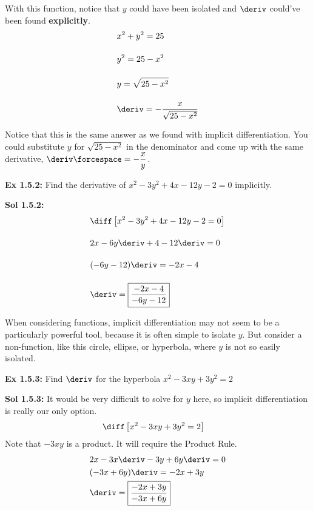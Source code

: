 With this function, notice that $y$ could have been isolated and $\deriv$ could've been found \textbf{explicitly}. \begin{align*}
    & x^2 + y^2 = 25 \\[11pt]
    & y^2 = 25 - x^2 \\[11pt]
    & y = \sqrt{25 - x^2} \\[11pt]
    & \deriv = -\dfrac{x}{\sqrt{25 - x^2}}
\end{align*}

Notice that this is the same answer as we found with implicit differentiation. You could substitute $y$ for $\sqrt{25 - x^2}$ in the denominator and come up with the same derivative, $\deriv \forcespace= -\dfrac{x}{y}$. \par

\begin{tcolorbox}[example]
    \textbf{Ex 1.5.2: } Find the derivative of $x^2 - 3y^2 + 4x - 12y - 2 = 0$ implicitly.
\end{tcolorbox}
\begin{tcolorbox}[solution]
    \textbf{Sol 1.5.2: } \begin{align*}
        & \diff \left[x^2 - 3y^2 + 4x - 12y - 2 = 0\right] \\[11pt]
        & 2x - 6y\deriv + 4 - 12\deriv = 0 \\[11pt]
        &(-6y - 12)\deriv = -2x - 4 \\[11pt]
        &\deriv = \boxed{\dfrac{-2x - 4}{-6y - 12}}
    \end{align*}
\end{tcolorbox}

When considering functions, implicit differentiation may not seem to be a particularly powerful tool, because it is often simple to isolate $y$. But consider a non-function, like this circle, ellipse, or hyperbola, where $y$ is not so easily isolated. \par

\begin{tcolorbox}[example]
    \textbf{Ex 1.5.3: } Find $\deriv$ for the hyperbola $x^2 - 3xy + 3y^2 = 2$
\end{tcolorbox}
\begin{tcolorbox}[solution]
    \textbf{Sol 1.5.3: } It would be very difficult to solve for $y$ here, so implicit differentiation is
    really our only option. \begin{align*}
        & \diff \left[x^2 - 3xy + 3y^2 = 2\right] 
    \end{align*}
    Note that $-3xy$ is a product. It will require the Product Rule. \begin{align*}
        & 2x - 3x\deriv - 3y + 6y\deriv = 0 \\
        & (-3x + 6y)\deriv = -2x + 3y \\
        & \deriv = \boxed{\dfrac{-2x + 3y}{-3x + 6y}}
    \end{align*}
\end{tcolorbox} \vspace{11pt}

